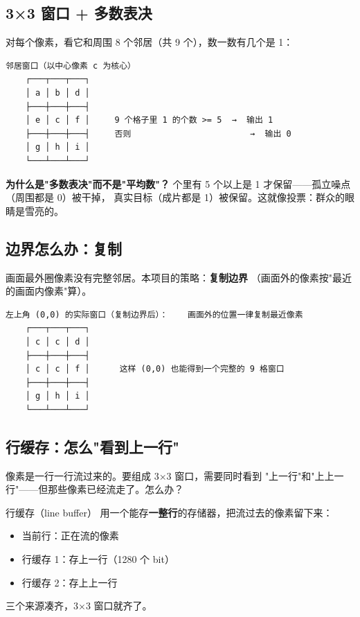 \documentclass[11pt]{ctexart}
\begin{document}
\subsection{3×3 窗口 + 多数表决}

对每个像素，看它和周围 8 个邻居（共 9 个），数一数有几个是 1：

\begin{Verbatim}[frame=single,fontsize=\small]
    邻居窗口（以中心像素 c 为核心）
    ┌───┬───┬───┐
    │ a │ b │ d │
    ├───┼───┼───┤
    │ e │ c │ f │     9 个格子里 1 的个数 >= 5  →  输出 1
    ├───┼───┼───┤     否则                        →  输出 0
    │ g │ h │ i │
    └───┴───┴───┘
\end{Verbatim}

\textbf{为什么是"多数表决"而不是"平均数"？} 个里有 5 个以上是 1 才保留——孤立噪点（周围都是 0）被干掉，
真实目标（成片都是 1）被保留。这就像投票：群众的眼睛是雪亮的。

\subsection{边界怎么办：复制}

画面最外圈像素没有完整邻居。本项目的策略：\textbf{复制边界}
（画面外的像素按"最近的画面内像素"算）。

\begin{Verbatim}[frame=single,fontsize=\small]
左上角 (0,0) 的实际窗口（复制边界后）：    画面外的位置一律复制最近像素
    ┌───┬───┬───┐
    │ c │ c │ d │
    ├───┼───┼───┤
    │ c │ c │ f │      这样 (0,0) 也能得到一个完整的 9 格窗口
    ├───┼───┼───┤
    │ g │ h │ i │
    └───┴───┴───┘
\end{Verbatim}

\subsection{行缓存：怎么"看到上一行"}

像素是一行一行流过来的。要组成 3×3 窗口，需要同时看到
"上一行"和"上上一行"——但那些像素已经流走了。怎么办？

\begin{keybox}{行缓存（line buffer）}
用一个能存\textbf{一整行}的存储器，把流过去的像素留下来：\\
\begin{itemize}
  \item 当前行：正在流的像素
  \item 行缓存 1：存上一行（1280 个 bit）
  \item 行缓存 2：存上上一行
\end{itemize}
三个来源凑齐，3×3 窗口就齐了。
\end{keybox}
\end{document}

